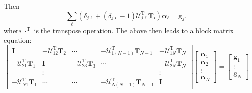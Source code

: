 \documentclass[ 12pt, a4paper]{article}
\renewcommand{\vec}[1]{\boldsymbol{#1}}
\begin{document}
 Then
\begin{equation}
 \sum_{\ell}(\delta_{j \ell} +  (\delta_{j \ell}-1) \vec {\mathcal U}_{j \ell}^{\mathrm T} \vec T_\ell) \vec \alpha_\ell  =  \vec g_j,
\end{equation}
where $\cdot ^{\mathrm T}$ is the transpose operation. The above then leads to a block matrix equation:
\begin{equation}
  \begin{bmatrix}
    \vec I & - \vec {\mathcal U}_{1 2}^{\mathrm T}\vec T_2 & \cdots & - \vec {\mathcal U}_{1 (N-1)}^{\mathrm T} \vec T_{N-1} & - \vec {\mathcal U}_{1 N}^{\mathrm T} \vec T_N \\
    - \vec {\mathcal U}_{2 1}^{\mathrm T} \vec T_1 & \vec I &  - \vec {\mathcal U}_{2 3}^{\mathrm T} \vec T_3 & \cdots & - \vec {\mathcal U}_{2 N}^{\mathrm T} \vec T_N \\
     & \vdots & & & \vdots \\
     - \vec {\mathcal U}_{N 1}^{\mathrm T} \vec T_1  & \cdots & \cdots & -  \vec {\mathcal U}_{N (N-1)}^{\mathrm T} \vec T_{N-1} & \vec I
  \end{bmatrix}
  \begin{bmatrix}
    \vec \alpha_1 \\
    \vec \alpha_2 \\
    \vdots \\
    \vec \alpha_N
  \end{bmatrix}
   = \begin{bmatrix}
     \vec g_1 \\
     \vdots \\
     \vec g_N
   \end{bmatrix}
\end{equation}


\printbibliography
\end{document}
